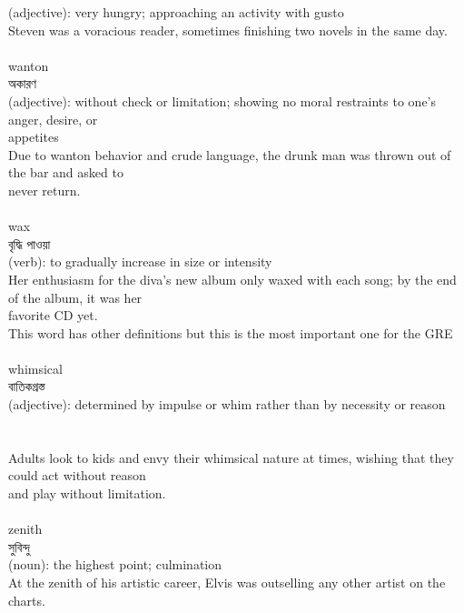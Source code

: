 \documentclass{article}
\begin{document}
{(adjective): very hungry; approaching an activity with gusto\\Steven was a voracious reader, sometimes finishing two novels in the same day.\\}\\
{wanton}\\
{অকারণ}\\
{(adjective): without check or limitation; showing no moral restraints to one's anger, desire, or\\appetites\\Due to wanton behavior and crude language, the drunk man was thrown out of the bar and asked to\\never return.\\}\\
{wax}\\
{বৃদ্ধি পাওয়া}\\
{(verb): to gradually increase in size or intensity\\Her enthusiasm for the diva's new album only waxed with each song; by the end of the album, it was her\\favorite CD yet.\\This word has other definitions but this is the most important one for the GRE\\}\\
{whimsical}\\
{বাতিকগ্রস্ত}\\
{(adjective): determined by impulse or whim rather than by necessity or reason\\\\                                                                                  \\Adults look to kids and envy their whimsical nature at times, wishing that they could act without reason\\and play without limitation.\\}\\
{zenith}\\
{সুবিন্দু}\\
{(noun): the highest point; culmination\\At the zenith of his artistic career, Elvis was outselling any other artist on the charts.\\\\}\\
\end{document}
